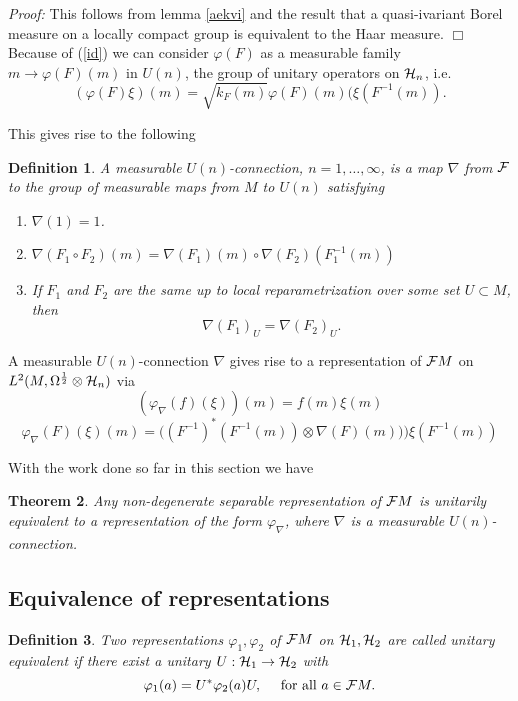 \documentclass[12pt]{article}
\def\cf{{\cal F}}
\def\ch{{\cal H}}
\newtheorem{thm}{Theorem}[subsection]
\newtheorem{definition}[thm]{Definition}
\newcommand{\cF}{{\cal F}}
\begin{document}
\textit{Proof:} This follows from lemma \ref{aekvi} and the result that a quasi-ivariant Borel  measure on a locally compact group is equivalent to the Haar measure.   
\hfill $\Box$   \\ 

Because of (\ref{id}) we can consider $\varphi (F)$ as a measurable family $m\to \varphi (F)(m)$ in $U(n)$, the group of unitary operators on $\ch_n$, i.e. 
$$(\varphi (F)\xi ) (m) =\sqrt{k_F (m)} \varphi (F)(m) (\xi (F^{-1}(m)) .$$

This gives rise to the following
\begin{definition}
A measurable $U(n)$-connection, $n=1,\ldots , \infty$, is a map $\nabla$ from $\cF$ to the group of measurable maps from $M$ to $U(n)$ satisfying
\begin{enumerate}
\item $\nabla (1)= 1$.
\item $\nabla (F_1 \circ F_2)(m)=\nabla (F_1) (m) \circ \nabla (F_2)(F_1^{-1}(m))$
\item If $F_1$ and $F_2$ are the same up to local reparametrization over some set $U\subset M$, then 
$$ \nabla ( F_1)_U= \nabla (F_2)_U  . $$ 
\end{enumerate} 
\end{definition}

A measurable $U(n)$-connection $\nabla$ gives rise to a representation of $\cF M$ on $L^2(M,\Omega^{\frac12}\otimes \ch_n )$ via
$$  ( \varphi_\nabla (f)(\xi))(m)=f(m)\xi (m) $$
$$  \varphi_\nabla (F)(\xi)(m) = \big(   (F^{-1})^* (F^{-1}(m))  \otimes  \nabla (F)(m)) \big)\xi (F^{-1}(m))    $$

With the work done so far in this section we have 

\begin{thm} \label{flowrep}
Any non-degenerate separable representation of $\cF M$ is unitarily equivalent to a representation of the form $\varphi_\nabla$, where $\nabla$ is a measurable $U(n)$-connection.
\end{thm}



\subsection{Equivalence of representations}
\begin{definition}
Two representations $\varphi_1, \varphi_2$ of $\cf M$ on $\ch_1,\ch_2$ are called unitary equivalent if there exist a unitary $U:\ch_1 \to \ch_2$ with  
$$\varphi_1(a)=U^* \varphi_2 (a) U , \quad \hbox{ for all } a\in \cf M. $$  
\end{definition}
\end{document}
